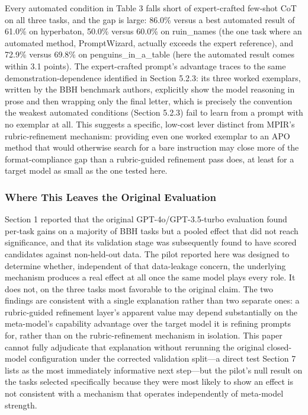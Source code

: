 \documentclass[a4paper,fleqn]{cas-sc}
\begin{document}
Every automated condition in Table 3 falls short of expert-crafted few-shot CoT on all three tasks, and the gap is large: 86.0\% versus a best automated result of 61.0\% on hyperbaton, 50.0\% versus 60.0\% on ruin\_\allowbreak{}names (the one task where an automated method, PromptWizard, actually exceeds the expert reference), and 72.9\% versus 69.8\% on penguins\_\allowbreak{}in\_\allowbreak{}a\_\allowbreak{}table (here the automated result comes within 3.1 points). The expert-crafted prompt's advantage traces to the same demonstration-dependence identified in Section 5.2.3: its three worked exemplars, written by the BBH benchmark authors, explicitly show the model reasoning in prose and then wrapping only the final letter, which is precisely the convention the weakest automated conditions (Section 5.2.3) fail to learn from a prompt with no exemplar at all. This suggests a specific, low-cost lever distinct from MPIR's rubric-refinement mechanism: providing even one worked exemplar to an APO method that would otherwise search for a bare instruction may close more of the format-compliance gap than a rubric-guided refinement pass does, at least for a target model as small as the one tested here.

\subsubsection{Where This Leaves the Original Evaluation}

Section 1 reported that the original GPT-4o/GPT-3.5-turbo evaluation found per-task gains on a majority of BBH tasks but a pooled effect that did not reach significance, and that its validation stage was subsequently found to have scored candidates against non-held-out data. The pilot reported here was designed to determine whether, independent of that data-leakage concern, the underlying mechanism produces a real effect at all once the same model plays every role. It does not, on the three tasks most favorable to the original claim. The two findings are consistent with a single explanation rather than two separate ones: a rubric-guided refinement layer's apparent value may depend substantially on the meta-model's capability advantage over the target model it is refining prompts for, rather than on the rubric-refinement mechanism in isolation. This paper cannot fully adjudicate that explanation without rerunning the original closed-model configuration under the corrected validation split---a direct test Section 7 lists as the most immediately informative next step---but the pilot's null result on the tasks selected specifically because they were most likely to show an effect is not consistent with a mechanism that operates independently of meta-model strength.
\end{document}
